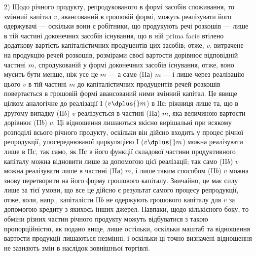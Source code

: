 2) Щодо річного продукту, репродукованого в формі засобів споживання,
то змінний капітал $v$, авансований в грошовій формі, можуть реалізувати
його одержувачі — оскільки вони є робітники, що продукують
речі розкошів — лише в тій частині доконечних засобів існування, що в
ній prima facie втілено додаткову вартість капіталістичних продуцентів
цих засобів; отже, $v$, витрачене на продукцію речей розкошів, розмірами
своєї вартости дорівнює відповідній частині $m$, спродукованій у
формі доконечних засобів існування, отже, воно мусить бути менше, ніж
усе це $m$ — а саме (II$а$) $m$ — і лише через реалізацію цього $v$ в тій частині
$m$ до капіталістичних продуцентів речей розкошів повертається в грошовій
формі авансований ними змінний капітал. Це явище цілком аналогічне
до реалізації I ($v \dplus{} m$) в ІІ$с$; ріжниця лише та, що в другому випадку
(IІ$b$) $v$ реалізується в частині (II$а$) $m$, яка величиною вартости дорівнює
(II$b$) $v$. Ці відношення лишаються якісно вирішальні при всякому
розподілі всього річного продукту, оскільки він дійсно входить у процес
річної репродукції, упосереднюваної циркуляцією I ($v \dplus{} m$) можна реалізувати
лише в II$с$, так само, як II$с$ в його функції складової частини
продуктивного капіталу можна відновити лише за допомогою цієї реалізації;
так само (II$b$) $v$ можна реалізувати лише в частині (II$а$) $m$, і лише
таким способом (II$b$) $v$ можна знову перетворити на його форму грошового
капіталу. Звичайно, це має силу лише за тієї умови, що все це дійсно
є результат самого процесу репродукції, отже, коли, напр., капіталісти
II$b$ не одержують грошового капіталу для $v$ за допомогою кредиту з
якихось інших джерел. Навпаки, щодо кількісного боку, то обміни різних
частин річного продукту можуть відбуватися з такою пропорційністю, як
подано вище, лише остільки, оскільки маштаб та відношення вартости
продукції лишаються незмінні, і оскільки ці точно визначені відношення
не зазнають змін в наслідок зовнішньої торгівлі.

